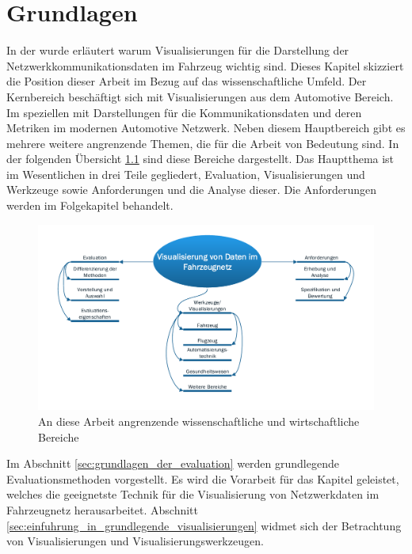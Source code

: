 \documentclass[draft=false
              ,paper=a4
              ,twoside=false
              ,fontsize=11pt
              ,headsepline
              ,BCOR10mm
              ,DIV11
              ]{scrbook}
\begin{document}
\chapter{Grundlagen} %
\label{cha:grundlagen}
In der  wurde erläutert warum Visualisierungen für die Darstellung der Netzwerkkommunikationsdaten im Fahrzeug wichtig sind. Dieses Kapitel skizziert die Position dieser Arbeit im Bezug auf das wissenschaftliche Umfeld. Der Kernbereich beschäftigt sich mit Visualisierungen aus dem Automotive Bereich. Im speziellen mit Darstellungen für die Kommunikationsdaten und deren Metriken im modernen Automotive Netzwerk. Neben diesem Hauptbereich gibt es mehrere weitere angrenzende Themen, die für die Arbeit von Bedeutung sind. In der folgenden Übersicht \ref{fig:theme_overview} sind diese Bereiche dargestellt. Das Hauptthema ist im Wesentlichen in drei Teile gegliedert, Evaluation, Visualisierungen und Werkzeuge sowie Anforderungen und die Analyse dieser. Die Anforderungen werden im Folgekapitel behandelt.

\begin{figure}[htbp]
  \centering
  \includegraphics[width=\textwidth]{img/theme_overview.pdf}
  \caption{An diese Arbeit angrenzende wissenschaftliche und wirtschaftliche Bereiche}
  \label{fig:theme_overview}
\end{figure}

Im Abschnitt \ref{sec:grundlagen_der_evaluation} werden grundlegende Evaluationsmethoden vorgestellt. Es wird die Vorarbeit für das Kapitel  geleistet, welches die geeignetste Technik für die Visualisierung von Netzwerkdaten im Fahrzeugnetz herausarbeitet. Abschnitt \ref{sec:einfuhrung_in_grundlegende_visualisierungen} widmet sich der Betrachtung von Visualisierungen und Visualisierungswerkzeugen. 
\end{document}
